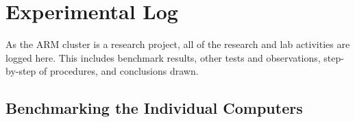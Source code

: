 

\chapter{Experimental Log}

As the ARM cluster is a research project, all of the research and lab activities are logged here. This includes benchmark results, other tests and observations, step-by-step of procedures, and conclusions drawn. 

\section{Benchmarking the Individual Computers}


